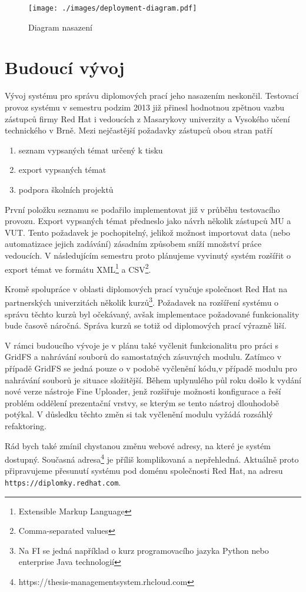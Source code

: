 \begin{figure}[htpb]
    \centering
    \texttt{[image: ./images/deployment-diagram.pdf]}
    \caption{Diagram nasazení\cite{vena-bp}}
    \label{fig:deployment}
\end{figure}

\section{Budoucí vývoj}
Vývoj systému pro správu diplomových prací jeho nasazením neskončil. Testovací provoz systému v semestru podzim 2013 již přinesl hodnotnou zpětnou vazbu zástupců firmy Red Hat i vedoucích z Masarykovy univerzity a Vysokého učení technického v Brně. Mezi nejčastější požadavky zástupců obou stran patří
\begin{enumerate}
\item seznam vypsaných témat určený k tisku
\item export vypsaných témat
\item podpora školních projektů
\end{enumerate}

První položku seznamu se podařilo implementovat již v průběhu testovacího provozu. Export vypsaných témat předneslo jako návrh několik zástupců MU a VUT. Tento požadavek je pochopitelný, jelikož možnost importovat data (nebo automatizace jejich zadávání) zásadním způsobem sníží množství práce vedoucích. V následujícím semestru proto plánujeme vyvinutý systém rozšířit o export témat ve formátu XML\footnote{Extensible Markup Language} a CSV\footnote{Comma-separated values}.


Kromě spolupráce v oblasti diplomových prací vyučuje společnost Red Hat na partnerských univerzitách několik kurzů\footnote{Na FI se jedná například o kurz programovacího jazyka Python nebo enterprise Java technologií}. Požadavek na rozšíření systému o správu těchto kurzů byl očekávaný, avšak implementace požadované funkcionality bude časově náročná. Správa kurzů se totiž od diplomových prací výrazně liší.

V rámci budoucího vývoje je v plánu také vyčlenit funkcionalitu pro práci s GridFS a nahrávání souborů do samostatných zásuvných modulu. Zatímco v případě GridFS  se jedná pouze o  v podobě vyčlenění kódu,v případě modulu pro nahrávání souborů je situace složitější. Během uplynulého půl roku došlo k vydání nové verze nástroje Fine Uploader, jenž rozšiřuje možnosti konfigurace a řeší problém oddělení prezentační vrstvy, se kterým se tento nástroj dlouhodobě potýkal. V důsledku těchto změn si tak vyčlenění modulu vyžádá rozsáhlý refaktoring.

Rád bych také zmínil chystanou změnu webové adresy, na které je systém dostupný. Současná adresa\footnote{https://thesis-managementsystem.rhcloud.com} je příliš komplikovaná a nepřehledná. Aktuálně proto připravujeme přesunutí systému pod doménu společnosti Red Hat, na adresu \texttt{https://diplomky.redhat.com}.
